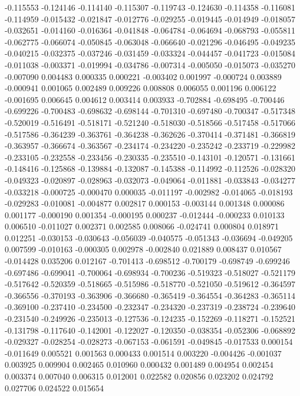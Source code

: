 -0.115553
-0.124146
-0.114140
-0.115307
-0.119743
-0.124630
-0.114358
-0.116081
-0.114959
-0.015432
-0.021847
-0.012776
-0.029255
-0.019445
-0.014949
-0.018057
-0.032651
-0.014160
-0.016364
-0.041848
-0.064784
-0.064694
-0.068793
-0.055811
-0.062775
-0.066074
-0.050845
-0.063048
-0.066640
-0.021296
-0.046495
-0.049235
-0.040215
-0.032375
-0.037246
-0.031459
-0.033324
-0.044457
-0.041723
-0.015084
-0.011038
-0.003371
-0.019994
-0.034786
-0.007314
-0.005050
-0.015073
-0.035270
-0.007090
0.004483
0.000335
0.000221
-0.003402
0.001997
-0.000724
0.003889
-0.000941
0.001065
0.002489
0.009226
0.008808
0.006055
0.001196
0.006122
-0.001695
0.006645
0.004612
0.003414
0.003933
-0.702884
-0.698495
-0.700446
-0.699226
-0.700483
-0.698632
-0.698144
-0.701310
-0.697480
-0.700347
-0.517348
-0.520019
-0.516491
-0.518171
-0.521240
-0.518030
-0.518566
-0.517458
-0.517066
-0.517586
-0.364239
-0.363761
-0.364238
-0.362626
-0.370414
-0.371481
-0.366819
-0.363957
-0.366674
-0.363567
-0.234174
-0.234220
-0.235242
-0.233719
-0.229982
-0.233105
-0.232558
-0.233456
-0.230335
-0.235510
-0.143101
-0.120571
-0.131661
-0.148416
-0.125868
-0.139884
-0.132087
-0.145388
-0.114992
-0.112526
-0.028320
-0.049323
-0.020897
-0.028963
-0.032073
-0.049064
-0.011881
-0.033843
-0.034277
-0.033218
-0.000725
-0.000470
0.000035
-0.011197
-0.002982
-0.014065
-0.018193
-0.029283
-0.010081
-0.004877
0.002817
0.000153
-0.003144
0.001348
0.000086
0.001177
-0.000190
0.001354
-0.000195
0.000237
-0.012444
-0.000233
0.010133
0.006510
-0.011027
0.002371
0.002585
0.008066
-0.024741
0.000804
0.018971
0.012251
-0.030153
-0.030643
-0.056039
-0.040575
-0.051343
-0.036694
-0.049205
0.007599
-0.010163
-0.000305
0.002978
-0.002840
0.021889
0.008437
0.010567
-0.014428
0.035206
0.012167
-0.701413
-0.698512
-0.700179
-0.698749
-0.699246
-0.697486
-0.699041
-0.700064
-0.698934
-0.700236
-0.519323
-0.518027
-0.521179
-0.517642
-0.520359
-0.518665
-0.515986
-0.518770
-0.521050
-0.519612
-0.364597
-0.366556
-0.370193
-0.363906
-0.366680
-0.365419
-0.364554
-0.364283
-0.365114
-0.369100
-0.237410
-0.234500
-0.232347
-0.234320
-0.237319
-0.238724
-0.239640
-0.231540
-0.249926
-0.235013
-0.127536
-0.124235
-0.152269
-0.118271
-0.152521
-0.131798
-0.117640
-0.142001
-0.122027
-0.120350
-0.038354
-0.052306
-0.068892
-0.029327
-0.028254
-0.028273
-0.067153
-0.061591
-0.049845
-0.017533
0.000154
-0.011649
0.005521
0.001563
0.000433
0.001514
0.003220
-0.004426
-0.001037
0.003925
0.009904
0.002465
0.010960
0.000432
0.001489
0.004954
0.002454
0.003374
0.007040
0.006315
0.012001
0.022582
0.020856
0.023202
0.024792
0.027706
0.024522
0.015654
